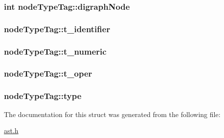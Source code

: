 \subsubsection[{\texorpdfstring{digraph\+Node}{digraphNode}}]{\setlength{\rightskip}{0pt plus 5cm}int node\+Type\+Tag\+::digraph\+Node}\hypertarget{structnodeTypeTag_a226ed9185fe6246ba0c51d8ce407bf99}{}\label{structnodeTypeTag_a226ed9185fe6246ba0c51d8ce407bf99}
\subsubsection[{\texorpdfstring{t\+\_\+identifier}{t_identifier}}]{ node\+Type\+Tag\+::t\+\_\+identifier}\hypertarget{structnodeTypeTag_a52029047facd5ca79d1555a4ee9d3351}{}\label{structnodeTypeTag_a52029047facd5ca79d1555a4ee9d3351}
\subsubsection[{\texorpdfstring{t\+\_\+numeric}{t_numeric}}]{ node\+Type\+Tag\+::t\+\_\+numeric}\hypertarget{structnodeTypeTag_aafce74687cbfc929557a304ce2a80127}{}\label{structnodeTypeTag_aafce74687cbfc929557a304ce2a80127}
\subsubsection[{\texorpdfstring{t\+\_\+oper}{t_oper}}]{ node\+Type\+Tag\+::t\+\_\+oper}\hypertarget{structnodeTypeTag_a932c223fde8957f1f7fecbeb438f0915}{}\label{structnodeTypeTag_a932c223fde8957f1f7fecbeb438f0915}
\subsubsection[{\texorpdfstring{type}{type}}]{ node\+Type\+Tag\+::type}\hypertarget{structnodeTypeTag_acd45ff2a9579322364fc31e50502a23c}{}\label{structnodeTypeTag_acd45ff2a9579322364fc31e50502a23c}


The documentation for this struct was generated from the following file\+:\begin{DoxyCompactItemize}
\item 
\hyperlink{ast_8h}{ast.\+h}\end{DoxyCompactItemize}
